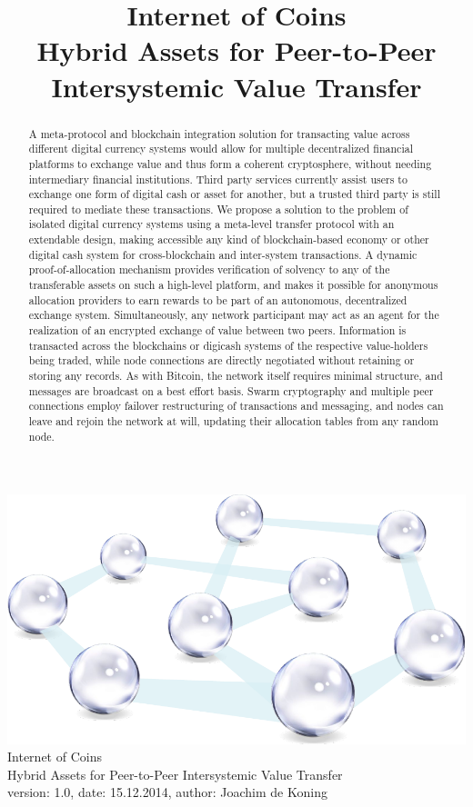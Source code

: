 \documentclass[11pt, a4paper]{article}
\title{Internet of Coins\\[6mm]
\small{Hybrid Assets for Peer-to-Peer Intersystemic Value Transfer}
}
\begin{document}
\begin{center}
\includegraphics[width=.5\textwidth]{images/internetofcoins_logo_vectorcolor2.pdf}\\[8ex]
{\Huge Internet of Coins}\\[2ex]
{\Large Hybrid Assets for Peer-to-Peer Intersystemic Value Transfer}\\[1ex]
{\tiny version: 1.0, date: 15.12.2014, author: Joachim de Koning }\\[4ex]
\end{center}

\begin{abstract}
 A meta-protocol and blockchain integration solution for transacting value across different digital currency systems would allow for multiple decentralized financial platforms to exchange value and thus form a coherent cryptosphere, without needing intermediary financial institutions. Third party services currently assist users to exchange one form of digital cash or asset for another, but a trusted third party is still required to mediate these transactions. We propose a solution to the problem of isolated digital currency systems using a meta-level transfer protocol with an extendable design, making accessible any kind of blockchain-based economy or other digital cash system for cross-blockchain and inter-system transactions. A dynamic proof-of-allocation mechanism provides verification of solvency to any of the transferable assets on such a high-level platform, and makes it possible for anonymous allocation providers to earn rewards to be part of an autonomous, decentralized exchange system. Simultaneously, any network participant may act as an agent for the realization of an encrypted exchange of value between two peers. Information is transacted across the blockchains or digicash systems of the respective value-holders being traded, while node connections are directly negotiated without retaining or storing any records. As with Bitcoin, the network itself requires minimal structure, and messages are broadcast on a best effort basis. Swarm cryptography and multiple peer connections employ failover restructuring of transactions and messaging, and nodes can leave and rejoin the network at will, updating their allocation tables from any random node.
\end{abstract}
\end{document}

